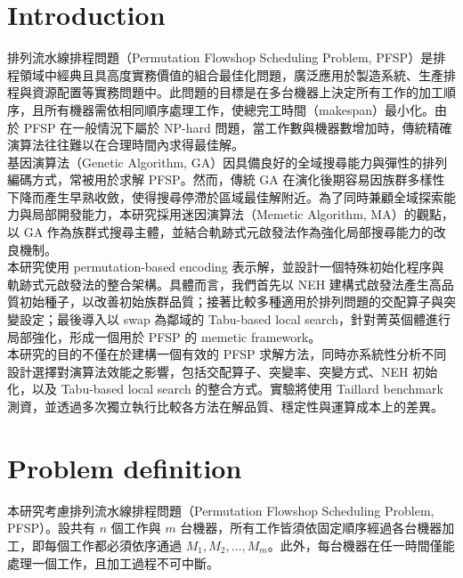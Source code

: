 \documentclass[conference]{IEEEtran}
\begin{document}
\section{Introduction}

排列流水線排程問題（Permutation Flowshop Scheduling Problem, PFSP）是排程領域中經典且具高度實務價值的組合最佳化問題，廣泛應用於製造系統、生產排程與資源配置等實務問題中。此問題的目標是在多台機器上決定所有工作的加工順序，且所有機器需依相同順序處理工作，使總完工時間（makespan）最小化。由於 PFSP 在一般情況下屬於 NP-hard 問題，當工作數與機器數增加時，傳統精確演算法往往難以在合理時間內求得最佳解。\\

基因演算法（Genetic Algorithm, GA）因具備良好的全域搜尋能力與彈性的排列編碼方式，常被用於求解 PFSP。然而，傳統 GA 在演化後期容易因族群多樣性下降而產生早熟收斂，使得搜尋停滯於區域最佳解附近。為了同時兼顧全域探索能力與局部開發能力，本研究採用迷因演算法（Memetic Algorithm, MA）的觀點，以 GA 作為族群式搜尋主體，並結合軌跡式元啟發法作為強化局部搜尋能力的改良機制。\\

本研究使用 permutation-based encoding 表示解，並設計一個特殊初始化程序與軌跡式元啟發法的整合架構。具體而言，我們首先以 NEH 建構式啟發法產生高品質初始種子，以改善初始族群品質；接著比較多種適用於排列問題的交配算子與突變設定；最後導入以 swap 為鄰域的 Tabu-based local search，針對菁英個體進行局部強化，形成一個用於 PFSP 的 memetic framework。\\

本研究的目的不僅在於建構一個有效的 PFSP 求解方法，同時亦系統性分析不同設計選擇對演算法效能之影響，包括交配算子、突變率、突變方式、NEH 初始化，以及 Tabu-based local search 的整合方式。實驗將使用 Taillard benchmark 測資，並透過多次獨立執行比較各方法在解品質、穩定性與運算成本上的差異。\\




\section{Problem definition}
本研究考慮排列流水線排程問題（Permutation Flowshop Scheduling Problem, PFSP）。設共有 \(n\) 個工作與 \(m\) 台機器，所有工作皆須依固定順序經過各台機器加工，即每個工作都必須依序通過 \(M_1, M_2, \dots, M_m\)。此外，每台機器在任一時間僅能處理一個工作，且加工過程不可中斷。
\end{document}
